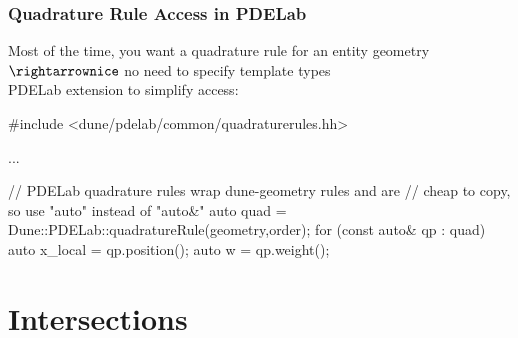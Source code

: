 \documentclass[aspectratio=169,11pt]{beamer}
\theoremstyle{definition}
\newcommand{\diffd}{\,d}
\begin{document}
\begin{frame}[fragile]
  \frametitle{Quadrature Rule Access in PDELab}

  Most of the time, you want a quadrature rule for an entity geometry\\[.5em]
  $\rightarrownice$ no need to specify template types\\[1em]

  PDELab extension to simplify access:
\begin{cppcode}
#include <dune/pdelab/common/quadraturerules.hh>

...

// PDELab quadrature rules wrap dune-geometry rules and are
// cheap to copy, so use "auto" instead of "auto&"
auto quad = Dune::PDELab::quadratureRule(geometry,order);
for (const auto& qp : quad)
{
    auto x_local = qp.position();
    auto w = qp.weight();
}
\end{cppcode}

\end{frame}


\section{Intersections}
\end{document}

